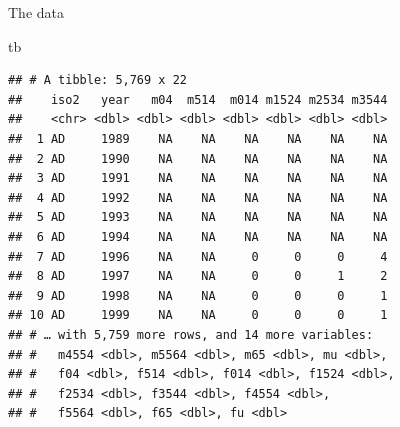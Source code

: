\documentclass[
  ignorenonframetext,
]{beamer}
\newenvironment{Shaded}{\begin{snugshade}}{\end{snugshade}}
\newcommand{\NormalTok}[1]{#1}
\begin{document}
\begin{frame}[fragile]{The data}
\protect\hypertarget{the-data-4}{}

\begin{Shaded}
\begin{Highlighting}[]
\NormalTok{tb}
\end{Highlighting}
\end{Shaded}

\begin{verbatim}
## # A tibble: 5,769 x 22
##    iso2   year   m04  m514  m014 m1524 m2534 m3544
##    <chr> <dbl> <dbl> <dbl> <dbl> <dbl> <dbl> <dbl>
##  1 AD     1989    NA    NA    NA    NA    NA    NA
##  2 AD     1990    NA    NA    NA    NA    NA    NA
##  3 AD     1991    NA    NA    NA    NA    NA    NA
##  4 AD     1992    NA    NA    NA    NA    NA    NA
##  5 AD     1993    NA    NA    NA    NA    NA    NA
##  6 AD     1994    NA    NA    NA    NA    NA    NA
##  7 AD     1996    NA    NA     0     0     0     4
##  8 AD     1997    NA    NA     0     0     1     2
##  9 AD     1998    NA    NA     0     0     0     1
## 10 AD     1999    NA    NA     0     0     0     1
## # … with 5,759 more rows, and 14 more variables:
## #   m4554 <dbl>, m5564 <dbl>, m65 <dbl>, mu <dbl>,
## #   f04 <dbl>, f514 <dbl>, f014 <dbl>, f1524 <dbl>,
## #   f2534 <dbl>, f3544 <dbl>, f4554 <dbl>,
## #   f5564 <dbl>, f65 <dbl>, fu <dbl>
\end{verbatim}

\end{frame}
\end{document}
